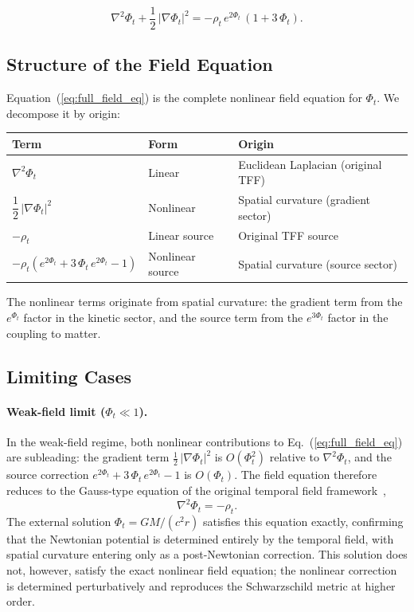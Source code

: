 \documentclass[12pt]{article}
\begin{document}
\begin{equation}
\boxed{\nabla^2\Phi_t + \frac{1}{2}\,|\nabla\Phi_t|^2 = -\rho_t\,e^{2\Phi_t}\,(1 + 3\,\Phi_t).}
\label{eq:full_field_eq}
\end{equation}

\subsection{Structure of the Field Equation}
\label{sec:structure}

Equation~(\ref{eq:full_field_eq}) is the complete nonlinear field equation for $\Phi_t$. We decompose it by origin:

\begin{center}
\small
\begin{tabular}{lll}
\hline
Term & Form & Origin \\
\hline
$\nabla^2\Phi_t$ & Linear & Euclidean Laplacian (original TFF) \\
$\dfrac{1}{2}\,|\nabla\Phi_t|^2$ & Nonlinear & Spatial curvature (gradient sector) \\
$-\rho_t$ & Linear source & Original TFF source \\
$-\rho_t\left(e^{2\Phi_t} + 3\,\Phi_t\,e^{2\Phi_t} - 1\right)$ & Nonlinear source & Spatial curvature (source sector) \\
\hline
\end{tabular}
\end{center}

The nonlinear terms originate from spatial curvature: the gradient term from the $e^{\Phi_t}$ factor in the kinetic sector, and the source term from the $e^{3\Phi_t}$ factor in the coupling to matter.

\subsection{Limiting Cases}
\label{sec:limits}

\paragraph{Weak-field limit ($\Phi_t \ll 1$).}

In the weak-field regime, both nonlinear contributions to Eq.~(\ref{eq:full_field_eq}) are subleading: the gradient term $\frac{1}{2}\,|\nabla\Phi_t|^2$ is $O(\Phi_t^2)$ relative to $\nabla^2\Phi_t$, and the source correction $e^{2\Phi_t} + 3\,\Phi_t\,e^{2\Phi_t} - 1$ is $O(\Phi_t)$. The field equation therefore reduces to the Gauss-type equation of the original temporal field framework~\cite{Gwak2026a},
$$
\nabla^2\Phi_t = -\rho_t.
$$
The external solution $\Phi_t = GM/(c^2 r)$ satisfies this equation exactly, confirming that the Newtonian potential is determined entirely by the temporal field, with spatial curvature entering only as a post-Newtonian correction. This solution does not, however, satisfy the exact nonlinear field equation; the nonlinear correction is determined perturbatively and reproduces the Schwarzschild metric at higher order.
\end{document}
